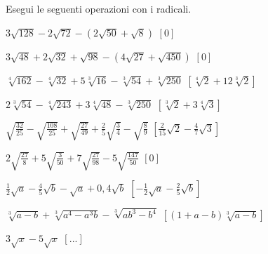 \begin{esercizio}[\Ast]
 \label{ese:2.52}
Esegui le seguenti operazioni con i radicali.
 \begin{enumeratea}
 \item $3\sqrt{128}-2\sqrt{72}-(2\sqrt{50}+\sqrt 8)$
  \hfill $\left[0\right]$
 \item $3\sqrt{48}+2\sqrt{32}+\sqrt{98}-(4\sqrt{27}+\sqrt{450})$
  \hfill $\left[0\right]$
 \item $\sqrt[4]{162}-\sqrt[4]{32}+5\sqrt[3]{16}-\sqrt[3]{54}+\sqrt[3]{250}$
  \hfill $\left[\sqrt[4]2+12\sqrt[3]2\right]$
 \item $2\sqrt[3]{54}-\sqrt[4]{243}+3\sqrt[4]{48}-\sqrt[3]{250}$
  \hfill $\left[\sqrt[3]2+3\sqrt[4]3\right]$
 \item $\sqrt{\frac{32}{25}}-\sqrt{\frac{108}{25}}+\sqrt{\frac{27}{49}}+
        \frac 2 5\sqrt{\frac 3 4}-\sqrt{\frac 8 9}$
  \hfill $\left[\frac 2{15}\sqrt 2-\frac 4 7\sqrt 3\right]$
 \item $2\sqrt{\frac{27} 8}+5\sqrt{\frac 3{50}}+7\sqrt{\frac{27}{98}}-
        5\sqrt{\frac{147}{50}}$
  \hfill $\left[0\right]$
 \item $\frac 1 2\sqrt a-\frac 4 5\sqrt b-\sqrt a+0,4\sqrt b$
  \hfill $\left[-\frac 1 2\sqrt a-\frac 2 5\sqrt b\right]$
 \item $\sqrt[3]{a-b}+\sqrt[3]{a^4-a^3b}-\sqrt[3]{{ab}^3-b^4}$
  \hfill $\left[(1+a-b)\sqrt[3]{a-b}\right]$
 \item $3\sqrt x-5\sqrt x$
  \hfill $\left[...\right]$
 \end{enumeratea}
\end{esercizio}

